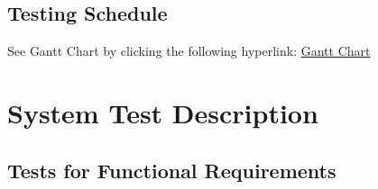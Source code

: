 \documentclass[12pt, titlepage]{article}
\begin{document}
\subsection{Testing Schedule}
		
See Gantt Chart by clicking the following hyperlink: 
\href{https://gitlab.cas.mcmaster.ca/dimitn/image_processing_app/tree/master/ProjectSchedule}{Gantt Chart}

\section{System Test Description}
	
\subsection{Tests for Functional Requirements}
\end{document}
